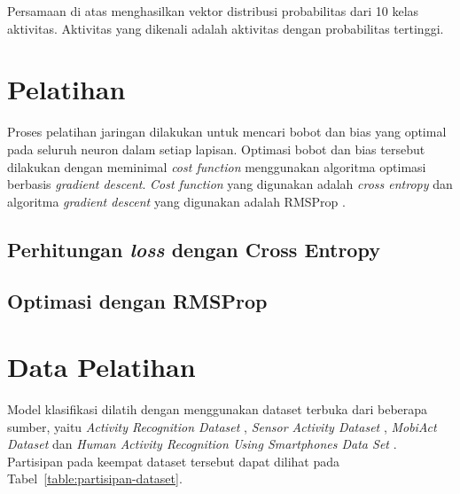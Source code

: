 Persamaan di atas menghasilkan vektor distribusi probabilitas dari 10 kelas aktivitas. Aktivitas yang dikenali adalah aktivitas dengan probabilitas tertinggi.


\section{Pelatihan}
Proses pelatihan jaringan dilakukan untuk mencari bobot dan bias yang optimal pada seluruh neuron dalam setiap lapisan. Optimasi bobot dan bias tersebut dilakukan dengan meminimal \textit{cost function} menggunakan algoritma optimasi berbasis \textit{gradient descent}. \textit{Cost function} yang digunakan adalah \textit{cross entropy} dan algoritma \textit{gradient descent} yang digunakan adalah RMSProp \citep{Dauphin-2015}.

\subsection{Perhitungan \textit{loss} dengan Cross Entropy}


\subsection{Optimasi dengan RMSProp}

%
%
\section{Data Pelatihan}
Model klasifikasi dilatih dengan menggunakan dataset terbuka dari beberapa sumber, yaitu \textit{Activity Recognition Dataset} \citep{shoaib-2013}, \textit{Sensor Activity Dataset} \citep{shoaib-2014}, \textit{MobiAct Dataset} \citep{vavoulas-2016} dan \textit{Human Activity Recognition Using Smartphones Data Set} \citep{anguita-2013}. Partisipan pada keempat dataset tersebut dapat dilihat pada Tabel~\ref{table:partisipan-dataset}.

